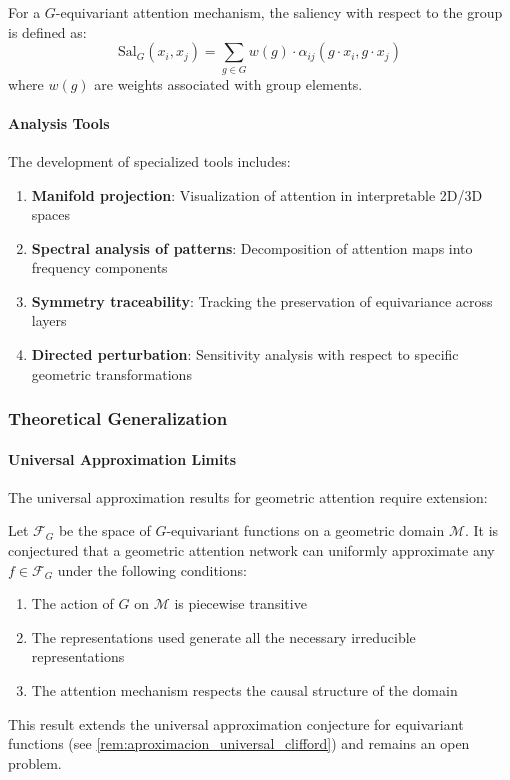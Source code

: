 \begin{definition}
For a $G$-equivariant attention mechanism, the saliency with respect to the group is defined as:
\begin{equation}
\text{Sal}_G(x_i, x_j) = \sum_{g \in G} w(g) \cdot \alpha_{ij}(g \cdot x_i, g \cdot x_j)
\label{eq:geometric_saliency}
\end{equation}
where $w(g)$ are weights associated with group elements.
\end{definition}

\paragraph{Analysis Tools}

The development of specialized tools includes:

\begin{enumerate}
    \item \textbf{Manifold projection}: Visualization of attention in interpretable 2D/3D spaces
    \item \textbf{Spectral analysis of patterns}: Decomposition of attention maps into frequency components
    \item \textbf{Symmetry traceability}: Tracking the preservation of equivariance across layers
    \item \textbf{Directed perturbation}: Sensitivity analysis with respect to specific geometric transformations
\end{enumerate}

\subsubsection{Theoretical Generalization}

\paragraph{Universal Approximation Limits}

The universal approximation results for geometric attention require extension:

\begin{remark}
Let $\mathcal{F}_G$ be the space of $G$-equivariant functions on a geometric domain $\mathcal{M}$. It is conjectured that a geometric attention network can uniformly approximate any $f \in \mathcal{F}_G$ under the following conditions:
\begin{enumerate}
    \item The action of $G$ on $\mathcal{M}$ is piecewise transitive
    \item The representations used generate all the necessary irreducible representations
    \item The attention mechanism respects the causal structure of the domain
\end{enumerate}
This result extends the universal approximation conjecture for equivariant functions (see \autoref{rem:aproximacion_universal_clifford}) and remains an open problem.
\end{remark}

